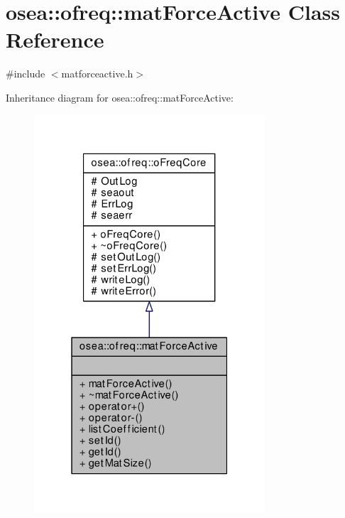 \hypertarget{classosea_1_1ofreq_1_1mat_force_active}{\section{osea\-:\-:ofreq\-:\-:mat\-Force\-Active Class Reference}
\label{classosea_1_1ofreq_1_1mat_force_active}
}


{\ttfamily \#include $<$matforceactive.\-h$>$}



Inheritance diagram for osea\-:\-:ofreq\-:\-:mat\-Force\-Active\-:\nopagebreak
\begin{figure}[H]
\begin{center}
\leavevmode
\includegraphics[width=244pt]{classosea_1_1ofreq_1_1mat_force_active__inherit__graph}
\end{center}
\end{figure}
